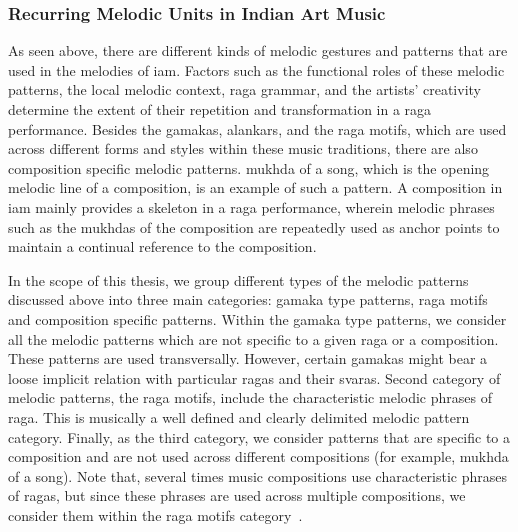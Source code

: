 \subsubsection{Recurring Melodic Units in Indian Art Music}
\label{sec:recurring_melodic_patterns_iam}

As seen above, there are different kinds of melodic gestures and patterns that are used in the melodies of \gls{iam}. Factors such as the functional roles of these melodic patterns, the local melodic context, \gls{raga} grammar, and the artists' creativity determine the extent of their repetition and transformation in a \gls{raga} performance. Besides the \glspl{gamaka}, \glspl{alankar}, and the \gls{raga} motifs, which are used across different forms and styles within these music traditions, there are also composition specific melodic patterns. \Gls{mukhda} of a song, which is the opening melodic line of a composition, is an example of such a pattern. A composition in \gls{iam} mainly provides a skeleton in a \gls{raga} performance, wherein melodic phrases such as the \glspl{mukhda} of the composition are repeatedly used as anchor points to maintain a continual reference to the composition.%

In the scope of this thesis, we group different types of the melodic patterns discussed above into three main categories: \gls{gamaka} type patterns, \gls{raga} motifs and composition specific patterns. Within the \gls{gamaka} type patterns, we consider all the melodic patterns which are not specific to a given \gls{raga} or a composition. These patterns are used transversally. However, certain \glspl{gamaka} might bear a loose implicit relation with particular \glspl{raga} and their \glspl{svara}. Second category of melodic patterns, the \gls{raga} motifs, include the characteristic melodic phrases of \gls{raga}. This is musically a well defined and clearly delimited melodic pattern category. Finally, as the third category, we consider patterns that are specific to a composition and are not used across different compositions (for example, \gls{mukhda} of a song). Note that, several times music compositions use characteristic phrases of \glspl{raga}, but since these phrases are used across multiple compositions, we consider them within the \gls{raga} motifs category~\citep{meer1980hindustani,Bagchee1998}.


